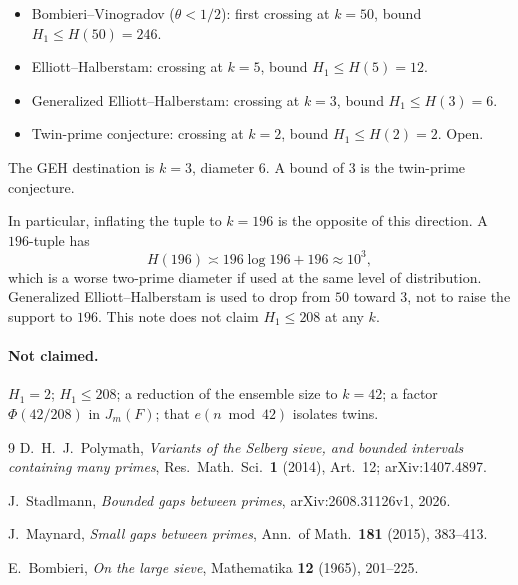 \documentclass[11pt,a4paper]{article}
\theoremstyle{plain}
\theoremstyle{remark}
\begin{document}
\begin{itemize}
\item Bombieri--Vinogradov (\(\theta<1/2\)): first crossing at \(k=50\), bound \(H_1\le H(50)=246\).
\item Elliott--Halberstam: crossing at \(k=5\), bound \(H_1\le H(5)=12\).
\item Generalized Elliott--Halberstam: crossing at \(k=3\), bound \(H_1\le H(3)=6\).
\item Twin-prime conjecture: crossing at \(k=2\), bound \(H_1\le H(2)=2\). Open.
\end{itemize}

The GEH destination is \(k=3\), diameter \(6\). A bound of \(3\) is the twin-prime conjecture.

In particular, inflating the tuple to \(k=196\) is the opposite of this direction. A \(196\)-tuple has
\[
H(196)\asymp 196\log 196+196\approx 10^3,
\]
which is a worse two-prime diameter if used at the same level of distribution. Generalized Elliott--Halberstam is used to drop from \(50\) toward \(3\), not to raise the support to \(196\). This note does not claim \(H_1\le 208\) at any \(k\).


\paragraph{Not claimed.}
\(H_1=2\); \(H_1\le 208\); a reduction of the ensemble size to \(k=42\); a factor \(\Phi(42/208)\) in \(J_m(F)\); that \(e(n\bmod 42)\) isolates twins.

\begin{thebibliography}{9}
D.~H.~J.~Polymath,
\emph{Variants of the Selberg sieve, and bounded intervals containing many primes},
Res.\ Math.\ Sci.\ \textbf{1} (2014), Art.~12;
arXiv:1407.4897.

J.~Stadlmann,
\emph{Bounded gaps between primes},
arXiv:2608.31126v1, 2026.

J.~Maynard,
\emph{Small gaps between primes},
Ann.\ of Math.\ \textbf{181} (2015), 383--413.

E.~Bombieri,
\emph{On the large sieve},
Mathematika \textbf{12} (1965), 201--225.
\end{thebibliography}
\end{document}
